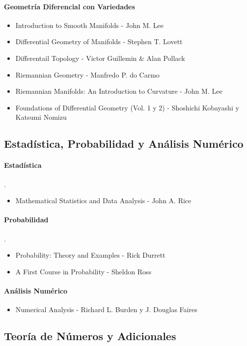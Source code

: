 \documentclass{article}
\begin{document}
\paragraph*{Geometr\'ia Diferencial con Variedades}
\begin{itemize}
	\item Introduction to Smooth Manifolds - John M. Lee
	\item Differential Geometry of Manifolds - Stephen T. Lovett
	\item Differentail Topology - Victor Guillemin & Alan Pollack
	\item Riemannian Geometry - Manfredo P. do Carmo
	\item Riemannian Manifolds: An Introduction to Curvature - John M. Lee
	\item Foundations of Differential Geometry (Vol. 1 y 2) - Shoshichi Kobayashi y Katsumi Nomizu
\end{itemize}
\subsection*{Estad\'istica, Probabilidad y An\'alisis Num\'erico}
\paragraph*{Estad\'istica}.
\begin{itemize}
	\item Mathematical Statistics and Data Analysis - John A. Rice
\end{itemize}
\paragraph*{Probabilidad}.
\begin{itemize}
	\item Probability: Theory and Examples - Rick Durrett
	\item A First Course in Probability - Sheldon Ross
\end{itemize}
\paragraph*{An\'alisis Num\'erico}
\begin{itemize}
	\item Numerical Analysis - Richard L. Burden y J. Douglas Faires
\end{itemize}
\subsection*{Teor\'ia de N\'umeros y Adicionales}
\end{document}
